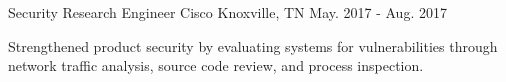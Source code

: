 \begin{cventries}
  \cventry
    {Security Research Engineer} %
    {Cisco} %
    {Knoxville, TN} %
    {May. 2017 - Aug. 2017} %
    {
      \begin{cvitems}
        \item {Strengthened product security by evaluating systems for vulnerabilities through network traffic analysis, source code review, and process inspection.}
      \end{cvitems}
    }


\end{cventries}
